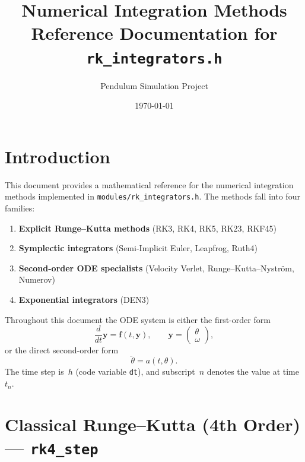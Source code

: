 \documentclass[11pt,a4paper]{article}
\title{Numerical Integration Methods\\[4pt]
       \large Reference Documentation for \texttt{rk\_integrators.h}}
\author{Pendulum Simulation Project}
\date{\today}
\newcommand{\by}{\mathbf{y}}
\newcommand{\bff}{\mathbf{f}}
\begin{document}
\maketitle
\tableofcontents
\newpage

\section{Introduction}

This document provides a mathematical reference for the numerical integration
methods implemented in \texttt{modules/rk\_integrators.h}. The methods fall into
four families:
\begin{enumerate}
  \item \textbf{Explicit Runge--Kutta methods} (RK3, RK4, RK5, RK23, RKF45)
  \item \textbf{Symplectic integrators} (Semi-Implicit Euler, Leapfrog, Ruth4)
  \item \textbf{Second-order ODE specialists} (Velocity Verlet, Runge--Kutta--Nystr\"{o}m, Numerov)
  \item \textbf{Exponential integrators} (DEN3)
\end{enumerate}

Throughout this document the ODE system is either the first-order form
\begin{equation}\label{eq:first-order}
  \frac{d}{dt}\by = \bff(t,\by),
  \qquad
  \by = \begin{pmatrix}\theta \\ \omega\end{pmatrix},
\end{equation}
or the direct second-order form
\begin{equation}\label{eq:second-order}
  \ddot\theta = a(t,\theta).
\end{equation}
The time step is~$h$ (code variable \texttt{dt}), and subscript~$n$ denotes the
value at time~$t_n$.

\section{Classical Runge--Kutta (4th Order) --- \texttt{rk4\_step}}
\label{sec:rk4}
\end{document}
